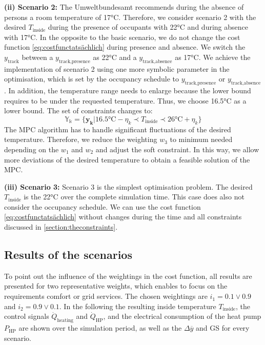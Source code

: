 \textbf{(ii) Scenario 2:}\newline
The Umweltbundesamt \cite{Umweltbundesamt.7.10.2021} recommends during the absence of persons a room temperature of 17°C. Therefore, we consider scenario 2 with the desired $T_\text{inside}$ during the presence of occupants with 22°C and during absence with 17°C. In the opposite to the basic scenario, we do not change the cost function \ref{eq:costfunctatsächlich} during presence and absence. We switch the $y_\text{track}$ between a $y_\text{track,presence}$ as 22°C and a $y_\text{track,absence}$ as 17°C. We achieve the implementation of scenario 2 using one more symbolic parameter in the optimisation, which is set by the occupancy schedule to $y_\text{track,presence}$ or $y_\text{track,absence}$. In addition, the temperature range needs to enlarge because the lower bound requires to be under the requested temperature. Thus, we choose 16.5°C as a lower bound. The set of constraints changes to:
\begin{equation}
    \label{ConstraintYScenario2}
    \mathbb{Y_k} = \{\mathbf{y_k}| 16.5 \text{°C} - \eta_k \prec T_\text{inside} \prec 26 \text{°C}+ \eta_k\} 
\end{equation}
The MPC algorithm has to handle significant fluctuations of the desired temperature. Therefore, we reduce the weighting $w_\text{3}$ to minimum needed depending on the $w_\text{1}$ and $w_\text{2}$ and adjust the soft constraint. In this way, we allow more deviations of the desired temperature to obtain a feasible solution of the MPC. \newline 

\textbf{(iii) Scenario 3:}\newline
Scenario 3 is the simplest optimisation problem. The desired $T_\text{inside}$ is the 22°C over the complete simulation time. This case does also not consider the occupancy schedule. We can use the cost function \ref{eq:costfunctatsächlich} without changes during the time and all constraints discussed in \autoref{section:theconstraints}.

\subsection{Results of the scenarios}
\label{subsec:Results of the scenarios}
To point out the influence of the weightings in the cost function, all results are presented for two representative weights, which enables to focus on the requirements comfort or grid services. The chosen weightings are $i_\text{1} = 0.1 \vee 0.9$ and $i_\text{2} = 0.9 \vee 0.1$. In the following the resulting inside temperature $T_\text{inside}$, the control signals  $\dot{Q}_\text{heating}$ and $\dot{Q}_\text{HP}$, and the electrical consumption of the heat pump $P_\text{HP}$ are shown over the simulation period, as well as the $\Delta \overline{y}$ and GS for every scenario.\newline

